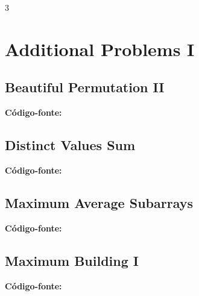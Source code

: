 \documentclass[8pt]{extarticle}
\begin{document}
\pagebreak
\begin{multicols*}{3}

\section{Additional Problems I}

\subsection{Beautiful Permutation II}
\begin{caixaenunciado}

\end{caixaenunciado}
\vspace{0.3cm}
\noindent\textbf{Código-fonte:}


\subsection{Distinct Values Sum}
\begin{caixaenunciado}

\end{caixaenunciado}
\vspace{0.3cm}
\noindent\textbf{Código-fonte:}


\subsection{Maximum Average Subarrays}
\begin{caixaenunciado}

\end{caixaenunciado}
\vspace{0.3cm}
\noindent\textbf{Código-fonte:}


\subsection{Maximum Building I}
\begin{caixaenunciado}

\end{caixaenunciado}
\vspace{0.3cm}
\noindent\textbf{Código-fonte:}



\end{multicols*}
\end{document}
